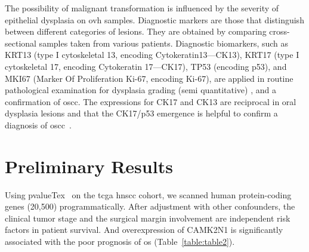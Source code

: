 \documentclass[12pt, a4paper]{article}
\newcommand{\comm}[1]{} %
\begin{document}
The possibility of malignant transformation is influenced by the severity of epithelial dysplasia on \acrshort{ovh} samples.
Diagnostic markers are those that distinguish between different categories of lesions. They are obtained by comparing cross-sectional samples taken from various patients.
Diagnostic biomarkers, such as KRT13 (type I cytoskeletal 13, encoding Cytokeratin13---CK13), KRT17 (type I cytoskeletal 17, encoding Cytokeratin 17---CK17), TP53 (encoding p53), and MKI67 (Marker Of Proliferation Ki-67, encoding Ki-67), are applied in routine pathological examination for dysplasia grading (semi quantitative) , and a confirmation of \acrshort{oscc}.
The expressions for CK17 and CK13 are reciprocal in oral dysplasia lesions and that the CK17/p53 emergence is helpful to confirm a diagnosis of \acrshort{oscc}~\citep{Mikami2011}.



\section{Preliminary Results}
Using pvalueTex~\citep{Chi2021} on the \acrshort{tcga} \acrshort{hnscc} cohort, we scanned human protein-coding genes (20,500) programmatically. After adjustment with other confounders, the clinical tumor stage and the surgical margin involvement are independent risk factors in patient survival. 
And overexpression of CAMK2N1 is significantly associated with the poor prognosis of \acrfull{os} (Table~\ref{table:table2}). 


\comm{
In our previous transtriptomics study~\citep{Chi2020}, %
the 9416 Kaplan-Meier plots with associated Cox's univariate and multivariate tables were generated by Cox modeling %
and justified by the ranking of hazard ratios.
The 967 genes were kept by criteria of uncorrected \textit{P} value (below 0.05) and \acrfull{hr} (greater than 1.5 or less than 0.5). %
At the final step, a stringent criteria (Bonferroni \textit{P} value correction) was used to yield a candidates: CAMK2N1. %
} %
\end{document}
